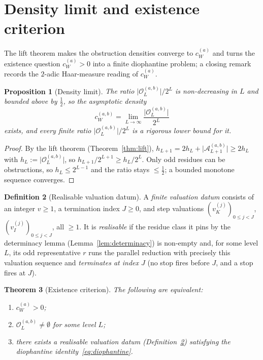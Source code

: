 \documentclass[11pt,reqno]{amsart}
\theoremstyle{plain}
\newtheorem{theorem}{Theorem}[section]
\newtheorem{proposition}[theorem]{Proposition}
\theoremstyle{definition}
\newtheorem{definition}[theorem]{Definition}
\theoremstyle{remark}
\newcommand{\Obs}{\mathcal{O}}
\newcommand{\Atom}{\mathcal{A}}
\newcommand{\vk}{v_{K}}
\newcommand{\vi}{v_{I}}
\newcommand{\cWa}{c_{W}^{(a)}}
\newcommand{\cWab}{c_{W}^{(a,b)}}
\newcommand{\Obsab}{\Obs_{L}^{(a,b)}}
\begin{document}
\section{Density limit and existence criterion}\label{sec:adic}

The lift theorem makes the obstruction densities converge to $\cWa$ and
turns the existence question $\cWa > 0$ into a finite diophantine problem;
a closing remark records the $2$-adic Haar-measure reading of $\cWa$.

\begin{proposition}[Density limit]\label{prop:density-limit}
The ratio $\lvert \Obsab \rvert / 2^L$ is non-decreasing in $L$ and bounded
above by $\tfrac12$, so the asymptotic density
\[
\cWab = \lim_{L \to \infty} \frac{\lvert \Obsab \rvert}{2^L}
\]
exists, and every finite ratio $\lvert \Obsab \rvert / 2^L$ is a rigorous
lower bound for it.
\end{proposition}

\begin{proof}
By the lift theorem (Theorem~\ref{thm:lift}),
$h_{L+1} = 2 h_L + \lvert \Atom_{L+1}^{(a,b)} \rvert \ge 2 h_L$ with
$h_L := \lvert \Obsab \rvert$, so $h_{L+1}/2^{L+1} \ge h_L/2^L$. Only odd
residues can be obstructions, so $h_L \le 2^{L-1}$ and the ratio stays
$\le \tfrac12$; a bounded monotone sequence converges. \qedhere
\end{proof}

\begin{definition}[Realisable valuation datum]\label{def:realisable}
A \emph{finite valuation datum} consists of an integer $v \ge 1$, a
termination index $J \ge 0$, and step valuations
$(\vk^{(j)})_{0 \le j < J}$, $(\vi^{(j)})_{0 \le j < J}$, all $\ge 1$. It
is \emph{realisable} if the residue class it pins by the determinacy lemma
(Lemma~\ref{lem:determinacy}) is non-empty and, for some level $L$, its odd
representative $r$ runs the parallel reduction with precisely this valuation
sequence and \emph{terminates at index $J$} (no stop fires before $J$, and a
stop fires at $J$).
\end{definition}

\begin{theorem}[Existence criterion]\label{thm:existence}
The following are equivalent:
\begin{enumerate}[label=\textup{(\arabic*)}]
\item $\cWa > 0$;
\item $\Obsab \ne \emptyset$ for some level $L$;
\item there exists a realisable valuation datum
(Definition~\ref{def:realisable}) satisfying the diophantine
identity~\eqref{eq:diophantine}.
\end{enumerate}
\end{theorem}
\end{document}
